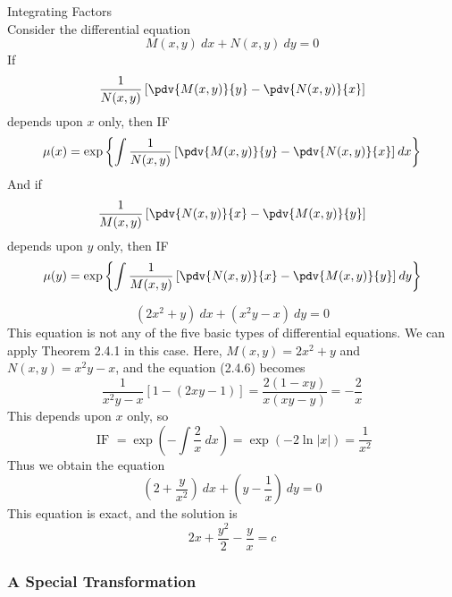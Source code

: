 \begin{theorem}{Integrating Factors}{}
    \\Consider the differential equation
    \begin{equation}
        M(x,y) \: d{x} + N(x,y) \: d{y} = 0
    \end{equation}
    If
    \begin{equation}
        \frac{1}{N(x,y)} \left[ \pdv{M(x,y)}{y} - \pdv{N(x,y)}{x} \right]  
    \end{equation}
    depends upon $x$ only, then IF
    \begin{equation}
        \mu(x) = \exp \left\{ \int{ \frac{1}{N(x,y)} \left[ \pdv{M(x,y)}{y} - \pdv{N(x,y)}{x} \right] } \: d{x} \right\}
    \end{equation}
    And if
    \begin{equation}
        \frac{1}{M(x,y)} \left[ \pdv{N(x,y)}{x} - \pdv{M(x,y)}{y} \right]
    \end{equation}
    depends upon $y$ only, then IF
    \begin{equation}
        \mu(y) = \exp \left\{ \int{ \frac{1}{M(x,y)} \left[ \pdv{N(x,y)}{x} - \pdv{M(x,y)}{y} \right] } \: d{y} \right\}
    \end{equation}
\end{theorem}

\begin{example}{\[
    (2x^2 + y) \: d{x} + (x^2y - x) \: d{y} = 0
\]}{}
    This equation is not any of the five basic types of differential equations. We can apply Theorem 2.4.1 in this case. Here, $M(x,y) = 2x^2+y$ and $N(x,y) = x^2y-x$, and the equation (2.4.6) becomes \[
        \frac{1}{x^2y-x} [1 - (2xy-1)] = \frac{2(1-xy)}{x(xy-y)} = -\frac{2}{x}
    \]
    This depends upon $x$ only, so \[
        \text{ IF } = \exp\left( -\int{\frac{2}{x}} \: d{x} \right) = \exp(-2\ln|x|) = \frac{1}{x^2}
    \]
    Thus we obtain the equation \[
        \left( 2 + \frac{y}{x^2} \right) \: d{x} + \left( y - \frac{1}{x} \right) \: d{y} = 0
    \]
    This equation is exact, and the solution is \[
        2x + \frac{y^2}{2} - \frac{y}{x} = c
    \]
\end{example}


\vspace{20pt}
\subsubsection{A Special Transformation}

